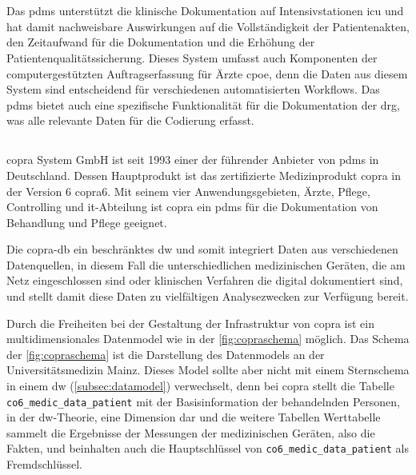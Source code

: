 \section{} \label{sec:pdms}

Das \acf{pdms} unterstützt die klinische Dokumentation auf Intensivstationen \glqq\acf{icu}\grqq{} und hat damit nachweisbare Auswirkungen auf die Vollständigkeit der Patientenakten, den Zeitaufwand für die Dokumentation und die Erhöhung der Patientenqualitätssicherung. %
Dieses System umfasst auch Komponenten der computergestützten Auftragserfassung für Ärzte \glqq\ac{cpoe}\grqq{}, denn die Daten aus diesem System sind entscheidend für verschiedenen automatisierten Workflows. %
Das \ac{pdms} bietet auch eine spezifische Funktionalität für die Dokumentation der \ac{drg}, was alle relevante Daten für die Codierung erfasst.%

\subsection{}
\acs{copra} System GmbH ist seit 1993 einer der führender Anbieter von \ac{pdms} in Deutschland. %
Dessen Hauptprodukt ist das zertifizierte Medizinprodukt \acf{copra} in der Version 6 \glqq\ac{copra}6\grqq{}. Mit seinem vier Anwendungsgebieten, Ärzte, Pflege, Controlling und \ac{it}-Abteilung ist \ac{copra} ein \ac{pdms} für die Dokumentation von Behandlung und Pflege geeignet.%

Die \ac{copra}-\ac{db} ein beschränktes \acf{dw} %
und somit integriert Daten aus verschiedenen Datenquellen, in diesem Fall die unterschiedlichen medizinischen Geräten, die am Netz eingeschlossen sind oder klinischen Verfahren die digital dokumentiert sind, und stellt damit diese Daten zu vielfältigen Analysezwecken zur Verfügung bereit. 

Durch die Freiheiten bei der Gestaltung der Infrastruktur von \ac{copra} ist ein multidimensionales Datenmodel wie in der \ref{fig:copraschema} möglich. Das Schema der \ref{fig:copraschema} ist die Darstellung des Datenmodels an der Universitätsmedizin Mainz. Dieses Model sollte aber nicht mit einem Sternschema in einem \ac{dw} (\ref{subsec:datamodel}) verwechselt, denn bei \ac{copra} stellt die Tabelle \texttt{co6\_medic\_data\_patient} mit der Basisinformation der behandelnden Personen, in der \ac{dw}-Theorie, eine Dimension dar und die weitere Tabellen \glqq Werttabelle\grqq{} sammelt die Ergebnisse der Messungen der medizinischen Geräten, also die Fakten, und beinhalten auch die Hauptschlüssel von \texttt{co6\_medic\_data\_patient} als Fremdschlüssel.

